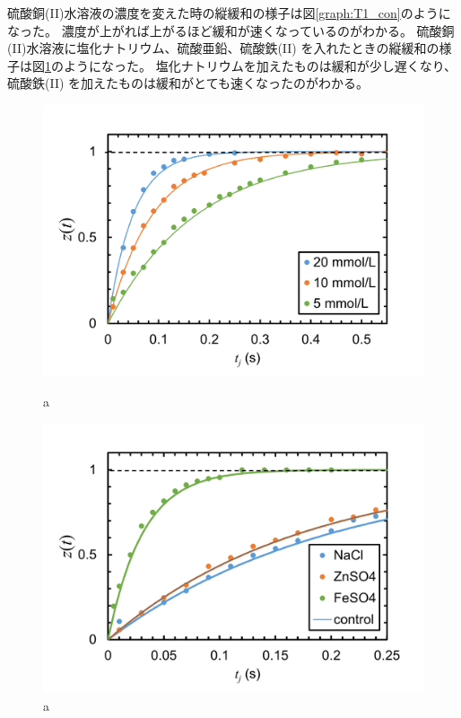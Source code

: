 \documentclass[11pt,dvipdfmx,a4paper]{jsarticle}
\begin{document}
硫酸銅(II)水溶液の濃度を変えた時の縦緩和の様子は図\ref{graph:T1_con}のようになった。
濃度が上がれば上がるほど緩和が速くなっているのがわかる。
硫酸銅(II)水溶液に塩化ナトリウム、硫酸亜鉛、硫酸鉄(II) を入れたときの縦緩和の様子は図\ref{graph:T1_var}のようになった。
塩化ナトリウムを加えたものは緩和が少し遅くなり、硫酸鉄(II) を加えたものは緩和がとても速くなったのがわかる。
\begin{figure}[H]
	\centering
	\begin{minipage}[t]{0.48\columnwidth}
		\centering
		\includegraphics[width=\columnwidth]{graph/T1_con.png}
		\caption{a}
		\label{graph:T1_con}
	\end{minipage}
	\hfill
	\begin{minipage}[t]{0.48\columnwidth}
		\centering
		\includegraphics[width=\columnwidth]{graph/T1_var.png}
		\caption{a}
		\label{graph:T1_var}
	\end{minipage}
\end{figure}
\end{document}
